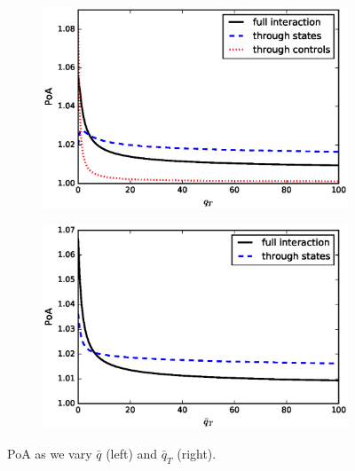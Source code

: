\documentclass[11pt]{article}
\begin{document}
\begin{figure}[!htb]
    \centering
    \begin{subfigure}{.45\textwidth}
        \includegraphics[scale=0.5]{PoA_half_more_steps_q_T.eps}
    \end{subfigure}
    \begin{subfigure}{.45\textwidth}
        \includegraphics[scale=0.5]{PoA_half_more_steps_qbar_T.eps}
    \end{subfigure}
    \caption{PoA as we vary $\bar{q}$ (left) and $\bar{q}_T$ (right).}
    \label{fig:qbar_qbar_T}
\end{figure}
\end{document}
